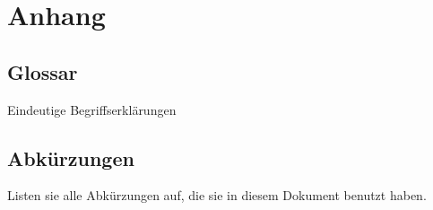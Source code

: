 \chapter{Anhang}

\section{Glossar}

Eindeutige Begriffserklärungen

\section{Abkürzungen}

Listen sie alle Abkürzungen auf, die sie in diesem Dokument benutzt
haben.
